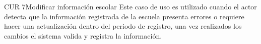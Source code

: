 \begin{UseCase}{CUR 7}{Modificar información escolar}
    {
    Este caso de uso es utilizado cuando el actor detecta que la información registrada de la escuela presenta errores o  requiere hacer una actualización dentro del periodo de registro, una vez realizados los cambios el sistema valida y registra la información.
    }
    
 			

\end{UseCase}
